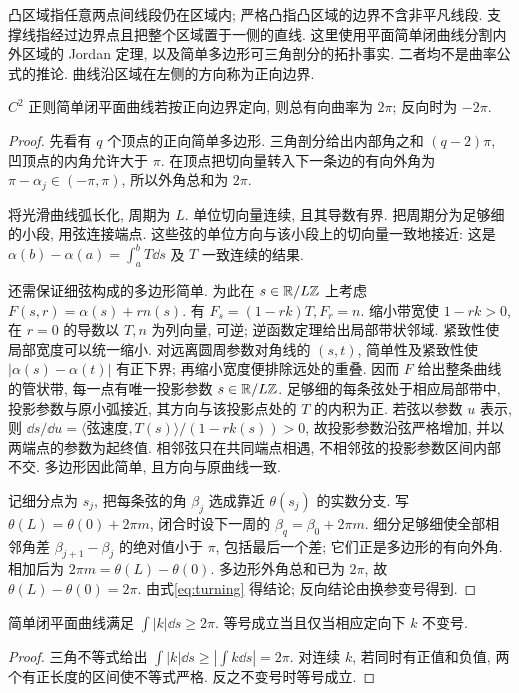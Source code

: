 凸区域指任意两点间线段仍在区域内; 严格凸指凸区域的边界不含非平凡线段. 支撑线指经过边界点且把整个区域置于一侧的直线. 这里使用平面简单闭曲线分割内外区域的 Jordan 定理, 以及简单多边形可三角剖分的拓扑事实. 二者均不是曲率公式的推论. 曲线沿区域在左侧的方向称为正向边界.
\begin{theorem}[转角定理]\label{thm:turning}
$C^2$ 正则简单闭平面曲线若按正向边界定向, 则总有向曲率为 $2\pi$; 反向时为 $-2\pi$.
\end{theorem}
\begin{proof}
先看有 $q$ 个顶点的正向简单多边形. 三角剖分给出内部角之和 $(q-2)\pi$, 凹顶点的内角允许大于 $\pi$. 在顶点把切向量转入下一条边的有向外角为 $\pi-\alpha_j\in(-\pi,\pi)$, 所以外角总和为 $2\pi$.

将光滑曲线弧长化, 周期为 $L$. 单位切向量连续, 且其导数有界. 把周期分为足够细的小段, 用弦连接端点. 这些弦的单位方向与该小段上的切向量一致地接近: 这是 $\alpha(b)-\alpha(a)=\int_a^b T\dd s$ 及 $T$ 一致连续的结果.

还需保证细弦构成的多边形简单. 为此在 $s\in\mathbb R/L\mathbb Z$ 上考虑 $F(s,r)=\alpha(s)+rn(s)$. 有 $F_s=(1-rk)T,F_r=n$. 缩小带宽使 $1-rk>0$, 在 $r=0$ 的导数以 $T,n$ 为列向量, 可逆; 逆函数定理给出局部带状邻域. 紧致性使局部宽度可以统一缩小. 对远离圆周参数对角线的 $(s,t)$, 简单性及紧致性使 $|\alpha(s)-\alpha(t)|$ 有正下界; 再缩小宽度便排除远处的重叠. 因而 $F$ 给出整条曲线的管状带, 每一点有唯一投影参数 $s\in\mathbb R/L\mathbb Z$. 足够细的每条弦处于相应局部带中, 投影参数与原小弧接近, 其方向与该投影点处的 $T$ 的内积为正. 若弦以参数 $u$ 表示, 则 $\dd s/\dd u=\langle\text{弦速度},T(s)\rangle/(1-rk(s))>0$, 故投影参数沿弦严格增加, 并以两端点的参数为起终值. 相邻弦只在共同端点相遇, 不相邻弦的投影参数区间内部不交. 多边形因此简单, 且方向与原曲线一致.

记细分点为 $s_j$, 把每条弦的角 $\beta_j$ 选成靠近 $\theta(s_j)$ 的实数分支. 写 $\theta(L)=\theta(0)+2\pi m$, 闭合时设下一周的 $\beta_q=\beta_0+2\pi m$. 细分足够细使全部相邻角差 $\beta_{j+1}-\beta_j$ 的绝对值小于 $\pi$, 包括最后一个差; 它们正是多边形的有向外角. 相加后为 $2\pi m=\theta(L)-\theta(0)$. 多边形外角总和已为 $2\pi$, 故 $\theta(L)-\theta(0)=2\pi$. 由式\eqref{eq:turning} 得结论; 反向结论由换参变号得到.
\end{proof}
\begin{corollary}
简单闭平面曲线满足 $\int|k|\dd s\ge2\pi$. 等号成立当且仅当相应定向下 $k$ 不变号.
\end{corollary}
\begin{proof}
三角不等式给出 $\int|k|\dd s\ge|\int k\dd s|=2\pi$. 对连续 $k$, 若同时有正值和负值, 两个有正长度的区间使不等式严格. 反之不变号时等号成立.
\end{proof}
